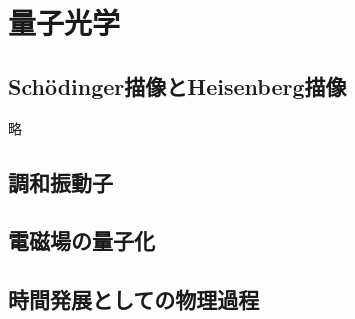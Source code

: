 \documentclass{report}
\begin{document}
  \chapter{量子光学}
    \section{Sch\"odinger描像とHeisenberg描像}
      略
    \section{調和振動子}
      
    \section{電磁場の量子化}
      
    \section{時間発展としての物理過程}
      
\end{document}
